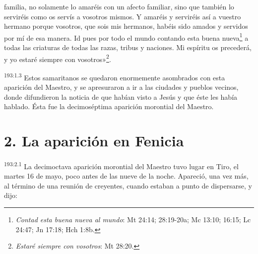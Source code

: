 familia, no solamente lo amaréis con un afecto familiar, sino que también lo serviréis como os servís a vosotros mismos. Y amaréis y serviréis así a vuestro hermano porque vosotros, que sois mis hermanos, habéis sido amados y servidos por mí de esa manera. Id pues por todo el mundo contando esta buena nueva\footnote{\textit{Contad esta buena nueva al mundo}: Mt 24:14; 28:19-20a; Mc 13:10; 16:15; Lc 24:47; Jn 17:18; Hch 1:8b.} a todas las criaturas de todas las razas, tribus y naciones. Mi espíritu os precederá, y yo estaré siempre con vosotros»\footnote{\textit{Estaré siempre con vosotros}: Mt 28:20.}.

\par
\textsuperscript{193:1.3} Estos samaritanos se quedaron enormemente asombrados con esta aparición del Maestro, y se apresuraron a ir a las ciudades y pueblos vecinos, donde difundieron la noticia de que habían visto a Jesús y que éste les había hablado. Ésta fue la decimoséptima aparición morontial del Maestro.

\section*{2. La aparición en Fenicia}
\par
\textsuperscript{193:2.1} La decimoctava aparición morontial del Maestro tuvo lugar en Tiro, el martes 16 de mayo, poco antes de las nueve de la noche. Apareció, una vez más, al término de una reunión de creyentes, cuando estaban a punto de dispersarse, y dijo:

